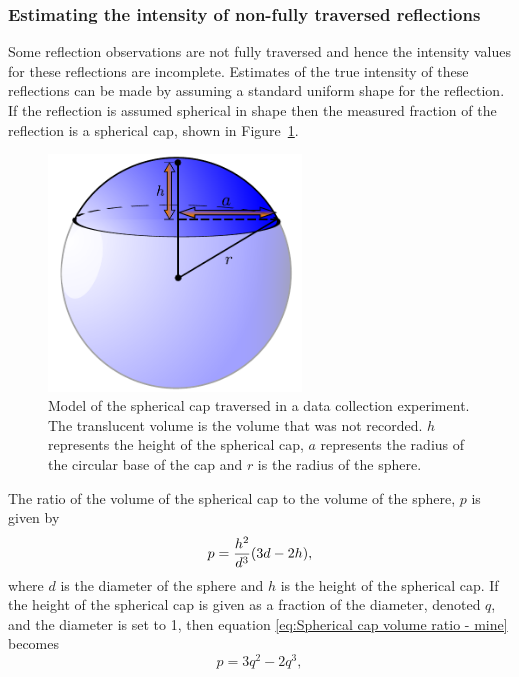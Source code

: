 \subsubsection{Estimating the intensity of non-fully traversed reflections}
\label{subs:Estimating the intensity of non-fully traversed reflections}
Some reflection observations are not fully traversed and hence the intensity values for these reflections are incomplete.
Estimates of the true intensity of these reflections can be made by assuming a standard uniform shape for the reflection.
If the reflection is assumed spherical in shape then the measured fraction of the reflection is a spherical cap, shown in Figure~\ref{fig:Spherical Cap}.
\begin{figure}[ht!]
    \centering
    \includegraphics[width=0.6\textwidth]{figures/datared/SphericalCap.pdf}
    \caption[Model of the spherical cap traversed in a data collection experiment.]{Model of the spherical cap traversed in a data collection experiment.
    The translucent volume is the volume that was not recorded.
    $h$ represents the height of the spherical cap, $a$ represents the radius of the circular base of the cap and $r$ is the radius of the sphere.}
    \label{fig:Spherical Cap}
\end{figure}
The ratio of the volume of the spherical cap to the volume of the sphere, $p$ is given by
\begin{equation}
    p = \frac{h^2}{d^3} (3d - 2h),
    \label{eq:Spherical cap volume ratio - mine}
\end{equation}
where $d$ is the diameter of the sphere and $h$ is the height of the spherical cap.
If the height of the spherical cap is given as a fraction of the diameter, denoted $q$, and the diameter is set to 1, then equation \ref{eq:Spherical cap volume ratio - mine} becomes
\begin{equation}
    p = 3q^2 - 2q^3,
    \label{eq:eq:Spherical cap volume ratio - Rossman}
\end{equation}
